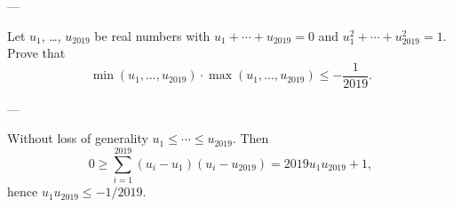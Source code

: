 
---

Let $u_1$, \ldots, $u_{2019}$ be real numbers with $u_1+\cdots+u_{2019}=0$ and $u_1^2+\cdots+u_{2019}^2=1$. Prove that
\[\min\left(u_1,\ldots,u_{2019}\right)\cdot\max\left(u_1,\ldots,u_{2019}\right)\le-\frac1{2019}.\]

---

Without loss of generality $u_1\le\cdots\le u_{2019}$. Then
\[
    0\ge\sum_{i=1}^{2019}\left(u_i-u_1\right)\left(u_i-u_{2019}\right)
    =2019u_1u_{2019}+1,
\]
hence $u_1u_{2019}\le-1/2019$.

